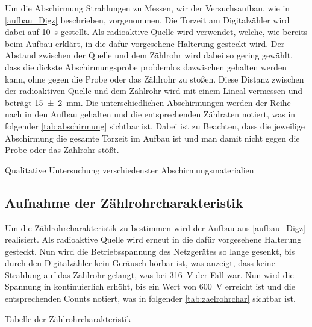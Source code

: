 \documentclass[12pt,english,ngerman]{scrartcl}
\begin{document}
Um die Abschirmung Strahlungen zu Messen, wir der Versuchsaufbau, wie in
\autoref{aufbau_Digz} beschrieben, vorgenommen. Die Torzeit am Digitalzähler
wird dabei auf \SI{10}{\second} gestellt. Als radioaktive Quelle wird
 verwendet, welche, wie bereits beim Aufbau erklärt, in die
dafür vorgesehene Halterung gesteckt wird. Der Abstand zwischen der Quelle und
dem Zählrohr wird dabei so gering gewählt, dass die dickste Abschirmungsprobe
problemlos dazwischen gehalten werden kann, ohne gegen die Probe oder das
Zählrohr zu stoßen. Diese Distanz zwischen der radioaktiven Quelle und dem
Zählrohr wird mit einem Lineal vermessen und beträgt \SI{15(2)}{\mm}. Die
unterschiedlichen Abschirmungen werden der Reihe nach in den Aufbau gehalten
und die entsprechenden Zählraten notiert, was in folgender
\autoref{tab:abschirmung} sichtbar ist. Dabei ist zu Beachten, dass die
jeweilige Abschirmung die gesamte Torzeit im Aufbau ist und man damit nicht
gegen die Probe oder das Zählrohr stößt.

\begin{table}[H]
  \caption{Qualitative Untersuchung verschiedenster Abschirmungsmaterialien}
  \label{tab:abschirmung}
  \begin{center}
    
  \end{center}
\end{table}


\subsection{Aufnahme der Zählrohrcharakteristik}

Um die Zählrohrcharakteristik zu bestimmen wird der Aufbau aus
\autoref{aufbau_Digz} realisiert. Als radioaktive Quelle wird erneut
 in die dafür vorgesehene Halterung gesteckt. Nun wird die
Betriebsspannung des Netzgerätes so lange gesenkt, bis durch den Digitalzähler
kein Geräusch hörbar ist, was anzeigt, dass keine Strahlung auf das Zählrohr
gelangt, was bei \SI{316}{\volt} der Fall war. Nun wird die Spannung in
kontinuierlich erhöht, bis ein Wert von \SI{600}{\volt} erreicht ist und die
entsprechenden Counts notiert, was in folgender \autoref{tab:zaelrohrchar}
sichtbar ist.

\begin{table}[H]
  \caption{Tabelle der Zählrohrcharakteristik}
  \label{tab:zaelrohrchar}
  \begin{center}
    
  \end{center}
\end{table}
\end{document}
